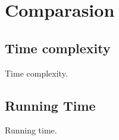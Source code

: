\section{Comparasion}

\subsection{Time complexity}
Time complexity.
\subsection{Running Time}
Running time.
